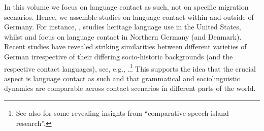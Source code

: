 \documentclass[output=paper]{langsci/langscibook}
\begin{document}

In this volume we focus on language contact as such, not on specific migration scenarios. Hence, we assemble studies on language contact within and outside of Germany. For instance, , studies heritage language use in the United States, whilst  and  focus on language contact in Northern Germany (and Denmark). Recent studies have revealed striking similarities between different varieties of German irrespective of their differing socio-historic backgrounds (and the respective contact languages), see, e.g., \citet{wiese_deutsch_2014}.\footnote{See also \citet{rosenberg_comparative_2003} for some revealing insights from “comparative speech island research”.} This supports the idea that the crucial aspect is language contact as such and that grammatical and sociolinguistic dynamics are comparable across contact scenarios in different parts of the world.
\end{document}
